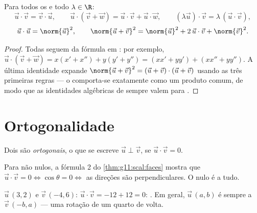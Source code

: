 \begin{proposition}\label{prop:g11:scal:rules}
Para todos os  e todo $\lambda \in \R$:
\[
\vec u \cdot \vec v = \vec v \cdot \vec u, \qquad
\vec u \cdot (\vec v + \vec w) = \vec u \cdot \vec v + \vec u \cdot
\vec w, \qquad
(\lambda \vec u)\cdot \vec v = \lambda\,(\vec u \cdot \vec v),
\]
\[
\vec u \cdot \vec u = \norm{\vec u}^2,
\qquad
\norm{\vec u + \vec v}^2 = \norm{\vec u}^2 + 2\,\vec u\cdot\vec v +
\norm{\vec v}^2 .
\]
\end{proposition}

\begin{proof}
Todas seguem da fórmula em : por exemplo,
$\vec u \cdot (\vec v + \vec w) = x(x' + x'') + y(y' + y'') =
(xx' + yy') + (xx'' + yy'')$. A última identidade expande
$\norm{\vec u + \vec v}^2 = (\vec u + \vec v)\cdot(\vec u + \vec v)$
usando as três primeiras regras --- o  comporta-se
exatamente como um produto comum, de modo que as identidades algébricas
de sempre valem para .
\end{proof}

\section{Ortogonalidade}

\begin{definition}\label{def:g11:scal:orthogonal}
Dois  são \emph{ortogonais}, o que se
escreve $\vec u \perp \vec v$, se $\vec u \cdot \vec v = 0$.
\end{definition}

\begin{remark}
Para  não nulos, a fórmula 2 do \cref{thm:g11:scal:faces} mostra
que $\vec u \cdot \vec v = 0 \iff \cos\theta = 0 \iff$ as direções são
perpendiculares. O  nulo é  a tudo.
\end{remark}

\begin{example}
$\vec u\,(3, 2)$ e $\vec v\,(-4, 6)$:
$\vec u \cdot \vec v = -12 + 12 = 0$: . Em geral,
$\vec u\,(a, b)$ é sempre  a $\vec v\,(-b, a)$ --- uma rotação
de um quarto de volta.
\end{example}

